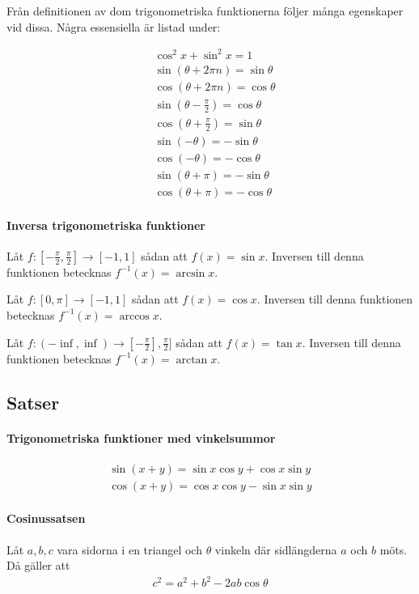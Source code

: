 Från definitionen av dom trigonometriska funktionerna följer många egenskaper vid dissa. Några essensiella är listad under:

\begin{align*}
	&\cos^2x + \sin^2x = 1\\
	&\sin\left(\theta + 2\pi n\right) = \sin\theta\\
	&\cos\left(\theta + 2\pi n\right) = \cos\theta\\
	&\sin\left(\theta - \frac{\pi}{2}\right) = \cos\theta\\
	&\cos\left(\theta + \frac{\pi}{2}\right) = \sin\theta\\
	&\sin\left(-\theta\right) = -\sin\theta\\
	&\cos\left(-\theta\right) = -\cos\theta\\
	&\sin\left(\theta+\pi\right) = -\sin\theta\\
	&\cos\left(\theta+\pi\right) = -\cos\theta
\end{align*}

\paragraph{Inversa trigonometriska funktioner}

Låt $f:\left[-\frac{\pi}{2},\frac{\pi}{2}\right]\to [-1,1]$ sådan att $f(x)=\sin x$. Inversen till denna funktionen betecknas $f^{-1}(x)=\arcsin x$.

Låt $f:[0,\pi]\to [-1,1]$ sådan att $f(x)=\cos x$. Inversen till denna funktionen betecknas $f^{-1}(x)=\arccos x$.

Låt $f:(-\inf,\inf)\to \left[-\frac{\pi}{2}\right],\frac{\pi}{2}]$ sådan att $f(x)=\tan x$. Inversen till denna funktionen betecknas $f^{-1}(x)=\arctan x$.

\subsection{Satser}

\paragraph{Trigonometriska funktioner med vinkelsummor}
\begin{align*}
	\sin\left(x+y\right) = \sin x\cos y + \cos x\sin y\\
	\cos\left(x+y\right) = \cos x\cos y - \sin x\sin y
\end{align*}

\paragraph{Cosinussatsen}

Låt $a,b,c$ vara sidorna i en triangel och $\theta$ vinkeln där sidlängderna $a$ och $b$ möts. Då gäller att
\begin{align*}
	c^2=a^2+b^2-2ab\cos\theta
\end{align*}